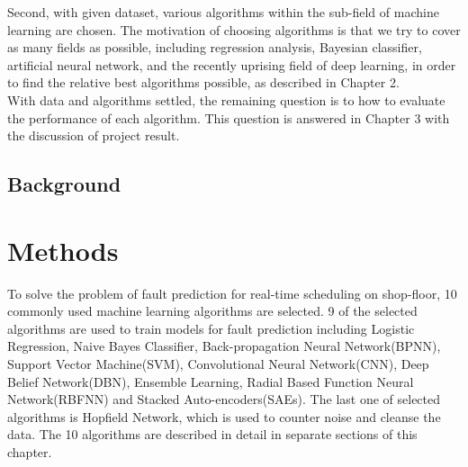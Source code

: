 \documentclass{kththesis}
\begin{document}
Second, with given dataset, various algorithms within the sub-field of machine learning are chosen. The motivation of choosing algorithms is that we try to cover as many fields as possible, including regression analysis, Bayesian classifier, artificial neural network, and the recently uprising field of deep learning, in order to find the relative best algorithms possible, as described in Chapter 2. \\

With data and algorithms settled, the remaining question is to how to evaluate the performance of each algorithm. This question is answered in Chapter 3 with the discussion of project result.\\ 

\section{Background}


\chapter{Methods}

To solve the problem of fault prediction for real-time scheduling on shop-floor, 10 commonly used machine learning algorithms are selected. 9 of the selected algorithms are used to train models for fault prediction including Logistic Regression, Naive Bayes Classifier, Back-propagation Neural Network(BPNN), Support Vector Machine(SVM), Convolutional Neural Network(CNN), Deep Belief Network(DBN), Ensemble Learning, Radial Based Function Neural Network(RBFNN) and Stacked Auto-encoders(SAEs). The last one of selected algorithms is Hopfield Network, which is used to counter noise and cleanse the data. The 10 algorithms are described in detail in separate sections of this chapter.
\end{document}
